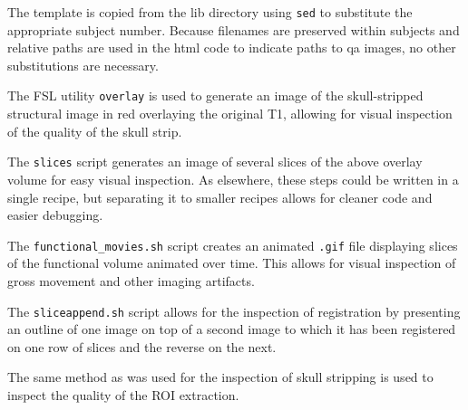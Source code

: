 The template is copied from the lib directory using \texttt{sed} to substitute the appropriate subject number. Because filenames are preserved within subjects and relative paths are used in the html code to indicate paths to qa images, no other substitutions are necessary.

The FSL utility \texttt{overlay} is used to generate an image of the skull-stripped structural image in red overlaying the original T1, allowing for visual inspection of the quality of the skull strip.

The \texttt{slices} script generates an image of several slices of the above overlay volume for easy visual inspection. As elsewhere, these steps could be written in a single recipe, but separating it to smaller recipes allows for cleaner code and easier debugging.

The \texttt{functional_movies.sh} script creates an animated \texttt{.gif} file displaying slices of the functional volume animated over time. This allows for visual inspection of gross movement and other imaging artifacts.

The \texttt{sliceappend.sh} script allows for the inspection of registration by presenting an outline of one image on top of a second image to which it has been registered on one row of slices and the reverse on the next.

The same method as was used for the inspection of skull stripping is used to inspect the quality of the ROI extraction.
